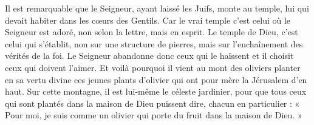  Il est remarquable que le Seigneur, ayant laissé les Juifs, monte au temple, lui qui devait habiter dans les cœurs des Gentils. Car le vrai temple c’est celui où le Seigneur est adoré, non selon la lettre, mais en esprit. Le temple de Dieu, c’est celui qui s’établit, non sur une structure de pierres, mais sur l’enchaînement des vérités de la foi. Le Seigneur abandonne donc ceux qui le haïssent et il choisit ceux qui doivent l’aimer. Et voilà pourquoi il vient au mont des oliviers planter en sa vertu divine ces jeunes plants d’olivier qui ont pour mère la Jérusalem d’en haut. Sur cette montagne, il est lui-même le céleste jardinier, pour que tous ceux qui sont plantés dans la maison de Dieu puissent dire, chacun en particulier : « Pour moi, je suis comme un olivier qui porte du fruit dans la maison de Dieu. »